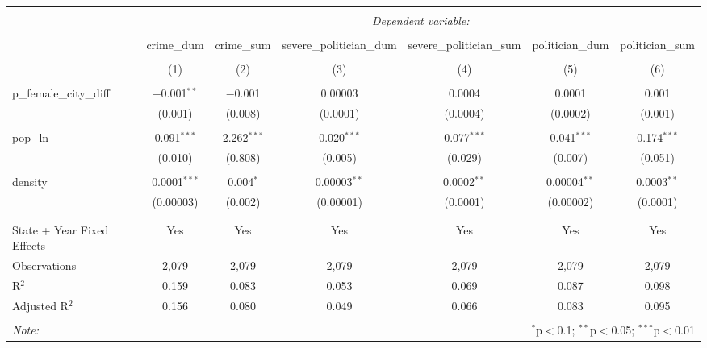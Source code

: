 
\begin{table}[!htbp] \centering 
  \caption{} 
  \label{} 
\begin{tabular}{@{\extracolsep{5pt}}lcccccc} 
\\[-1.8ex]\hline 
\hline \\[-1.8ex] 
 & \multicolumn{6}{c}{\textit{Dependent variable:}} \\ 
\cline{2-7} 
\\[-1.8ex] & crime\_dum & crime\_sum & severe\_politician\_dum & severe\_politician\_sum & politician\_dum & politician\_sum \\ 
\\[-1.8ex] & (1) & (2) & (3) & (4) & (5) & (6)\\ 
\hline \\[-1.8ex] 
 p\_female\_city\_diff & $-$0.001$^{**}$ & $-$0.001 & 0.00003 & 0.0004 & 0.0001 & 0.001 \\ 
  & (0.001) & (0.008) & (0.0001) & (0.0004) & (0.0002) & (0.001) \\ 
  & & & & & & \\ 
 pop\_ln & 0.091$^{***}$ & 2.262$^{***}$ & 0.020$^{***}$ & 0.077$^{***}$ & 0.041$^{***}$ & 0.174$^{***}$ \\ 
  & (0.010) & (0.808) & (0.005) & (0.029) & (0.007) & (0.051) \\ 
  & & & & & & \\ 
 density & 0.0001$^{***}$ & 0.004$^{*}$ & 0.00003$^{**}$ & 0.0002$^{**}$ & 0.00004$^{**}$ & 0.0003$^{**}$ \\ 
  & (0.00003) & (0.002) & (0.00001) & (0.0001) & (0.00002) & (0.0001) \\ 
  & & & & & & \\ 
\hline \\[-1.8ex] 
State + Year Fixed Effects & Yes & Yes & Yes & Yes & Yes & Yes \\ 
Observations & 2,079 & 2,079 & 2,079 & 2,079 & 2,079 & 2,079 \\ 
R$^{2}$ & 0.159 & 0.083 & 0.053 & 0.069 & 0.087 & 0.098 \\ 
Adjusted R$^{2}$ & 0.156 & 0.080 & 0.049 & 0.066 & 0.083 & 0.095 \\ 
\hline 
\hline \\[-1.8ex] 
\textit{Note:}  & \multicolumn{6}{r}{$^{*}$p$<$0.1; $^{**}$p$<$0.05; $^{***}$p$<$0.01} \\ 
\end{tabular} 
\end{table} 
